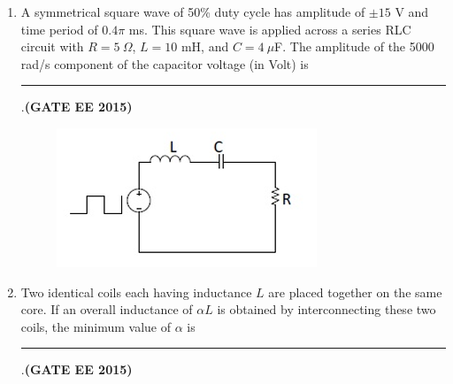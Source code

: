 \documentclass[a4paper,12pt]{exam}
\theoremstyle{remark}
\begin{document}
\begin{enumerate}
\item A symmetrical square wave of 50\% duty cycle has amplitude of $\pm 15$ V and time period of $0.4\pi$ ms. This square wave is applied across a series RLC circuit with $R = 5~\Omega$, $L = 10$ mH, and $C = 4~\mu$F. The amplitude of the 5000 rad/s component of the capacitor voltage (in Volt) is \rule{3cm}{0.15mm}.\hfill{\textbf{(GATE EE 2015)}}
\begin{figure}[H]
    \centering
    \includegraphics[width=0.5\columnwidth]{figs/2Q 55.png}
    \caption{}
    \label{fig:placeholder}
\end{figure}

\item Two identical coils each having inductance $L$ are placed together on the same core. If an overall inductance of $\alpha L$ is obtained by interconnecting these two coils, the minimum value of $\alpha$ is \rule{3cm}{0.15mm}.\hfill{\textbf{(GATE EE 2015)}}


\end{enumerate}
\end{document}
